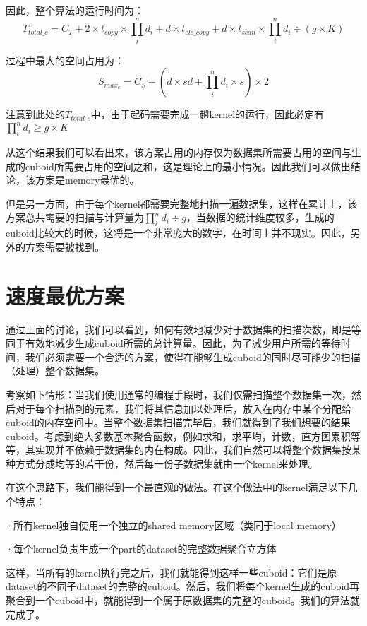 因此，整个算法的运行时间为：
\begin{equation}
T_{total\_c} = C_T + 2 \times t_{copy} \times \prod_{i}^{n} d_i + d \times t_{ele\_copy} + d \times t_{scan} \times \prod_{i}^{n} d_i \div (g \times K)
\end{equation}

过程中最大的空间占用为：
\begin{equation}
S_{max_c} = C_S + (d \times sd + \prod_{i}^{n} d_i \times s) \times 2
\end{equation}

注意到此处的$T_{total\_c}$中，由于起码需要完成一趟kernel的运行，因此必定有$\prod_{i}^{n} d_i \geq g \times K$

从这个结果我们可以看出来，该方案占用的内存仅为数据集所需要占用的空间与生成的cuboid所需要占用的空间之和，这是理论上的最小情况。因此我们可以做出结论，该方案是memory最优的。

但是另一方面，由于每个kernel都需要完整地扫描一遍数据集，这样在累计上，该方案总共需要的扫描与计算量为$\prod_{i}^{n} d_i \div g$，当数据的统计维度较多，生成的cuboid比较大的时候，这将是一个非常庞大的数字，在时间上并不现实。因此，另外的方案需要被找到。

\section{速度最优方案}
通过上面的讨论，我们可以看到，如何有效地减少对于数据集的扫描次数，即是等同于有效地减少生成cuboid所需的总计算量。因此，为了减少用户所需的等待时间，我们必须需要一个合适的方案，使得在能够生成cuboid的同时尽可能少的扫描（处理）整个数据集。

考察如下情形：当我们使用通常的编程手段时，我们仅需扫描整个数据集一次，然后对于每个扫描到的元素，我们将其信息加以处理后，放入在内存中某个分配给cuboid的内存空间中。当整个数据集扫描完毕后，我们就得到了我们想要的结果cuboid。考虑到绝大多数基本聚合函数，例如求和，求平均，计数，直方图累积等等，其实现并不依赖于数据集的内在构成。因此，我们自然可以将整个数据集按某种方式分成均等的若干份，然后每一份子数据集就由一个kernel来处理。

在这个思路下，我们能得到一个最直观的做法。在这个做法中的kernel满足以下几个特点：

{\quad}·所有kernel独自使用一个独立的shared memory区域（类同于local memory）

{\quad}·每个kernel负责生成一个part的dataset的完整数据聚合立方体

这样，当所有的kernel执行完之后，我们就能得到这样一些cuboid：它们是原dataset的不同子dataset的完整的cuboid。然后，我们将每个kernel生成的cuboid再聚合到一个cuboid中，就能得到一个属于原数据集的完整的cuboid。我们的算法就完成了。

